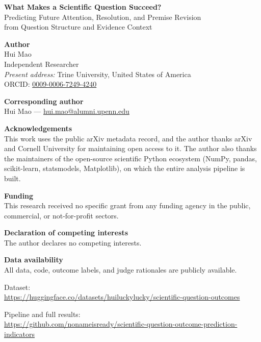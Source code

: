 \documentclass[11pt]{article}
\begin{document}
\begin{center}
{\Large\bfseries What Makes a Scientific Question Succeed?}\\[0.5em]
{\large Predicting Future Attention, Resolution, and Premise Revision\\
from Question Structure and Evidence Context}
\end{center}

\vspace{2em}

\noindent\textbf{Author}\\[0.4em]
Hui Mao\\
Independent Researcher\\
\emph{Present address:} Trine University, United States of America\\
ORCID: \href{https://orcid.org/0009-0006-7249-4240}{0009-0006-7249-4240}

\vspace{1.5em}

\noindent\textbf{Corresponding author}\\[0.4em]
Hui Mao --- \href{mailto:hui.mao@alumni.upenn.edu}{hui.mao@alumni.upenn.edu}

\vspace{1.5em}

\noindent\textbf{Acknowledgements}\\[0.4em]
This work uses the public arXiv metadata record, and the author thanks arXiv
and Cornell University for maintaining open access to it. The author also
thanks the maintainers of the open-source scientific Python ecosystem
(NumPy, pandas, scikit-learn, statsmodels, Matplotlib), on which the entire
analysis pipeline is built.

\vspace{1.5em}

\noindent\textbf{Funding}\\[0.4em]
This research received no specific grant from any funding agency in the
public, commercial, or not-for-profit sectors.

\vspace{1.5em}

\noindent\textbf{Declaration of competing interests}\\[0.4em]
The author declares no competing interests.

\vspace{1.5em}

\noindent\textbf{Data availability}\\[0.4em]
All data, code, outcome labels, and judge rationales are publicly available.

\smallskip
\noindent Dataset:\\
\url{https://huggingface.co/datasets/huiluckylucky/scientific-question-outcomes}

\smallskip
\noindent Pipeline and full results:\\
\url{https://github.com/nonameisready/scientific-question-outcome-prediction-indicators}
\end{document}
